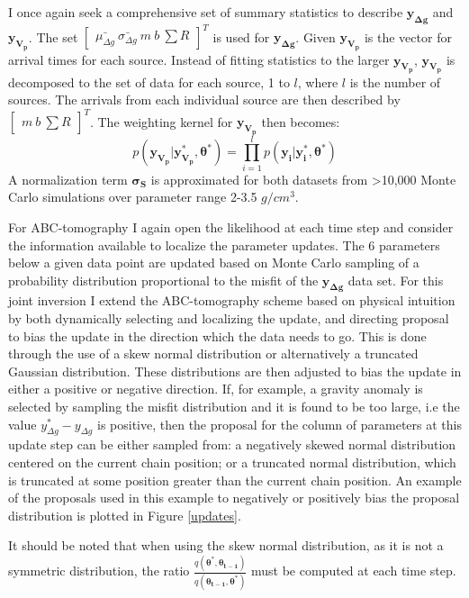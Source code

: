 I once again seek a comprehensive set of summary statistics to describe $\bm{y_{\Delta g}}$ and $\bm{y_{V_p}}$. The set $\begin{bmatrix}
\bar{\mu_{\Delta g}}\ \bar{\sigma_{\Delta g}}\ m\ b\ \sum R
\end{bmatrix}^T$ is used for $\bm{y_{\Delta g}}$. Given $\bm{y_{V_p}}$ is the vector for arrival times for each source. Instead of fitting statistics to the larger $\bm{y_{V_p}}$, $\bm{y_{V_p}}$ is decomposed to the set of data for each source, 1 to $l$, where $l$ is the number of sources. The arrivals from each individual source are then described by $\begin{bmatrix}
m\ b\ \sum R
\end{bmatrix}^T$. The weighting kernel for $\bm{y_{V_p}}$ then becomes:
\begin{equation}
	p(\bm{y_{V_p}}|\bm{y^*_{V_p}},\bm{\theta^*}) = \prod_{i = 1}^{l} p(\bm{y_i}|\bm{y^*_i},\bm{\theta^*})
\end{equation}
A normalization term $\bm{\sigma_S}$ is approximated for both datasets from >10,000 Monte Carlo simulations over parameter range 2-3.5 $g/cm^3$. \par

For ABC-tomography I again open the likelihood at each time step and consider the information available to localize the parameter updates. The 6 parameters below a given data point are updated based on Monte Carlo sampling of a probability distribution proportional to the misfit of the $\bm{y_{\Delta g}}$ data set. For this joint inversion I extend the ABC-tomography scheme based on physical intuition by both dynamically selecting and localizing the update, and directing proposal to bias the update in the direction which the data needs to go. This is done through the use of a skew normal distribution or alternatively a truncated Gaussian distribution. These distributions are then adjusted to bias the update in either a positive or negative direction. If, for example, a gravity anomaly is selected by sampling the misfit distribution and it is found to be too large, i.e the value $y^*_{\Delta g} - y_{\Delta g}$ is positive, then the proposal for the column of parameters at this update step can be either sampled from: a negatively skewed normal distribution centered on the current chain position; or a truncated normal distribution, which is truncated at some position greater than the current chain position. An example of the proposals used in this example to negatively or positively bias the proposal distribution is plotted in Figure \ref{updates}. \par
It should be noted that when using the skew normal distribution, as it is not a symmetric distribution, the ratio $\frac{q(\bm{\theta^*},\bm{\theta_{t-1}})}{q(\bm{\theta_{t-1}},\bm{\theta^*})}$ must be computed at each time step. \par

